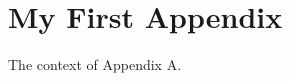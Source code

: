 \documentclass[11pt,twoside,openright]{report}
\begin{document}
\renewcommand{\bibname}{References}








\appendix

\chapter{My First Appendix}
\label{app:AppendixA}

The context of Appendix A.
\end{document}
